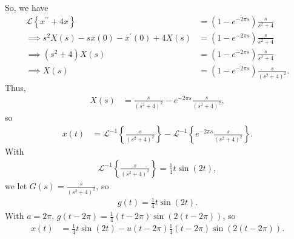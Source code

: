 \documentclass{report}
\begin{document}
    So, we have
    \begin{align*}
        \mathcal{L}\left\{x^{\prime\prime} + 4x\right\} &= (1-e^{-2\pi s})\frac{s}{s^{2}+4} \\
        \implies s^{2}X(s) -sx(0) - x^{\prime}(0) + 4X(s) &= (1-e^{-2\pi s})\frac{s}{s^{2}+4} \\
        \implies (s^{2} + 4)X(s) &= (1-e^{-2\pi s})\frac{s}{s^{2}+4} \\
        \implies X(s) &= (1-e^{-2\pi s})\frac{s}{(s^{2}+4)^{2}} 
    .\end{align*}
    Thus,
    \begin{align*}
        X(s) &= \frac{s}{(s^{2}+4)^{2}} - e^{-2\pi s}\frac{s}{(s^{2}+4)^{2}}
    ,\end{align*}
    so
    \begin{align*}
        x(t) &= \mathcal{L}^{-1}\left\{\frac{s}{(s^{2}+4)^{2}}\right\} - \mathcal{L}^{-1}\left\{e^{-2\pi s}\frac{s}{(s^{2}+4)^{2}}\right\}
    .\end{align*}
    With 
    \begin{align*}
        \mathcal{L}^{-1}\left\{\frac{s}{(s^{2}+4)^{2}}\right\} = \frac{1}{4}t\sin{\left(2t\right)}
    ,\end{align*}
    we let $G(s) = \frac{s}{(s^{2}+4)^{2}}$, so
    \begin{align*}
        g(t) = \frac{1}{4}t\sin{\left(2t\right)}
    .\end{align*}
    With $a = 2\pi$, $g(t-2\pi) = \frac{1}{4}(t-2\pi)\sin{\left(2(t-2\pi)\right)} $, so
    \begin{align*}
        x(t) &= \frac{1}{4}t\sin{\left(2t\right)} - u(t-2\pi)\frac{1}{4}(t-2\pi)\sin{\left(2(t-2\pi)\right)}
    .\end{align*}
\end{document}
